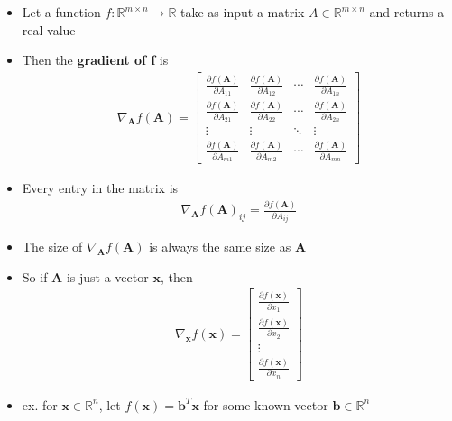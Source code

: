 \documentclass[letterpaper,12pt]{article}
\newcommand{\vect}[1]{\mathbf{#1}}
\newcommand{\matr}[1]{\mathbf{#1}}
\begin{document}
\begin{itemize}
 \item Let a function $f: \mathbb{R}^{m \times n} \to \mathbb{R}$ take as input a matrix $A \in \mathbb{R}^{m \times n}$ and returns a real value
 \item Then the \textbf{gradient of f} is
       \begin{align}
        \nabla_{\matr{A}} f(\matr{A}) = \begin{bmatrix}
         \frac{\partial f(\matr{A})}{\partial A_{11}} & \frac{\partial f(\matr{A})}{\partial A_{12}} & \cdots & \frac{\partial f(\matr{A})}{\partial A_{1n}} \\
         \frac{\partial f(\matr{A})}{\partial A_{21}} & \frac{\partial f(\matr{A})}{\partial A_{22}} & \cdots & \frac{\partial f(\matr{A})}{\partial A_{2n}} \\
         \vdots                                       & \vdots                                       & \ddots & \vdots                                       \\
         \frac{\partial f(\matr{A})}{\partial A_{m1}} & \frac{\partial f(\matr{A})}{\partial A_{m2}} & \cdots & \frac{\partial f(\matr{A})}{\partial A_{mn}}
        \end{bmatrix}
       \end{align}
 \item Every entry in the matrix is
       \begin{align}
        \nabla_{\matr{A}} f(\matr{A})_{ij} = \frac{\partial f(\matr{A})}{\partial A_{ij}}
       \end{align}
 \item The size of $\nabla_{\matr{A}} f(\matr{A})$ is always the same size as $\matr{A}$
 \item So if $\matr{A}$ is just a vector $\vect{x}$, then
       \begin{align}
        \nabla_{\vect{x}} f(\vect{x}) = \begin{bmatrix}
         \frac{\partial f(\vect{x})}{\partial x_{1}} \\
         \frac{\partial f(\vect{x})}{\partial x_{2}} \\
         \vdots                                      \\
         \frac{\partial f(\vect{x})}{\partial x_{n}}
        \end{bmatrix}
       \end{align}
 \item ex. for $\vect{x} \in \mathbb{R}^n$, let $f(\vect{x}) = \vect{b}^T \vect{x}$ for some known vector $\vect{b} \in \mathbb{R}^n$

\end{itemize}
\end{document}
